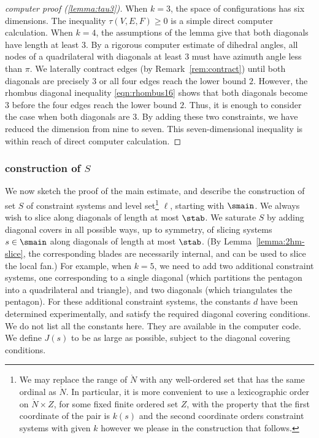 \begin{proof}[computer proof (\ref{lemma:tau3})]
  When $k=3$, the space of configurations has six dimensions.  The
  inequality $\tau(V,E,F)\ge0$ is a simple direct computer calculation.  When
  $k=4$, the assumptions of the lemma give that both diagonals have
  length at least $3$.  By a rigorous computer estimate of dihedral
  angles, all nodes of a quadrilateral with diagonals at least $3$
  must have azimuth angle less than $\pi$.  We laterally contract edges (by
  Remark~\ref{rem:contract}) until both diagonals are precisely $3$ or
  all four edges reach the lower bound $2$.  However, the rhombus
  diagonal inequality \eqref{eqn:rhombus16} shows that both diagonals
  become $3$ before the four edges reach the lower bound $2$.  Thus,
  it is enough to consider the case when both diagonals are $3$.  By
  adding these two constraints, we have reduced the dimension from nine
  to seven. This seven-dimensional inequality is within reach of direct
  computer calculation.
\end{proof}


\subsubsection{construction of $S$}

We now sketch the proof of the main estimate, and describe the
construction of set $S$ of constraint systems and level
set\footnote{We may replace the range of $\ring{N}$ with any
  well-ordered set that has the same ordinal as $\ring{N}$.  In
  particular, it is more convenient to use a lexicographic order on
  $\ring{N}\times Z$, for some fixed finite ordered set $Z$, with the
  property that the first coordinate of the pair is $k(s)$ and the
  second coordinate orders constraint systems with given $k$ however
  we please in the construction that follows.}  $\ell$, starting with
$\smain$.  We always wish to slice along diagonals of length at most
$\stab$.  We saturate $S$ by adding diagonal covers in all possible
ways, up to symmetry, of slicing systems $s\in \smain$ along diagonals
of length at most $\stab$.  (By Lemma~\ref{lemma:2hm-slice}, the
corresponding blades are necessarily internal, and can be used to
slice the local fan.)  For example, when $k=5$, we need to add two
additional constraint systems, one corresponding to a
single diagonal (which partitions the pentagon into a quadrilateral
and triangle), and two diagonals (which triangulates the pentagon).
For these additional constraint systems, the constants $d$ have been
determined experimentally, and satisfy the required diagonal covering
conditions.  We do not list all the constants here.  They are
available in the computer code.  We define $J(s)$ to be as large as
possible, subject to the diagonal covering conditions.

